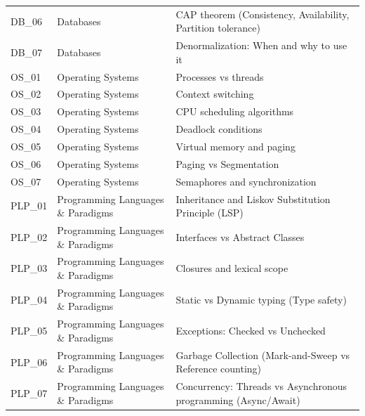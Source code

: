 \begin{table}[H]
\begin{tabular}{lll}
DB_06 & Databases & CAP theorem (Consistency, Availability, Partition tolerance) \\
DB_07 & Databases & Denormalization: When and why to use it \\
OS_01 & Operating Systems & Processes vs threads \\
OS_02 & Operating Systems & Context switching \\
OS_03 & Operating Systems & CPU scheduling algorithms \\
OS_04 & Operating Systems & Deadlock conditions \\
OS_05 & Operating Systems & Virtual memory and paging \\
OS_06 & Operating Systems & Paging vs Segmentation \\
OS_07 & Operating Systems & Semaphores and synchronization \\
PLP_01 & Programming Languages \& Paradigms & Inheritance and Liskov Substitution Principle (LSP) \\
PLP_02 & Programming Languages \& Paradigms & Interfaces vs Abstract Classes \\
PLP_03 & Programming Languages \& Paradigms & Closures and lexical scope \\
PLP_04 & Programming Languages \& Paradigms & Static vs Dynamic typing (Type safety) \\
PLP_05 & Programming Languages \& Paradigms & Exceptions: Checked vs Unchecked \\
PLP_06 & Programming Languages \& Paradigms & Garbage Collection (Mark-and-Sweep vs Reference counting) \\
PLP_07 & Programming Languages \& Paradigms & Concurrency: Threads vs Asynchronous programming (Async/Await) \\
\bottomrule
\end{tabular}
\end{table}
